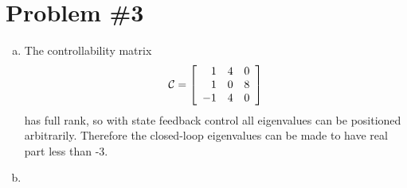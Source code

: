 \documentclass{article}
\begin{document}
\section*{Problem \#3}
\begin{enumerate}[(a)]
\item{
The controllability matrix
$$
\mathcal{C} =
\left[\begin{array}{r r r}
  1 & 4 &  0 \\
  1 & 0 &  8 \\
 -1 & 4 &  0
\end{array}\right]
$$
has full rank, so with state feedback control all eigenvalues can be
positioned arbitrarily. Therefore the closed-loop eigenvalues can be
made to have real part less than -3.
}
\item{
}
\end{enumerate}
\end{document}
